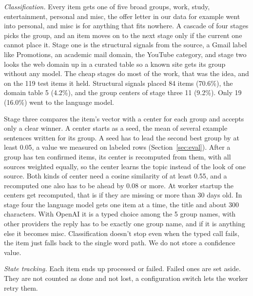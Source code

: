 \documentclass[conference]{IEEEtran}
\begin{document}
\textit{Classification.} Every item gets one of five broad groups, work, study, entertainment, personal and misc, the offer letter in our data for example went into personal, and misc is for anything that fits nowhere. A cascade of four stages picks the group, and an item moves on to the next stage only if the current one cannot place it. Stage one is the structural signals from the source, a Gmail label like Promotions, an academic mail domain, the YouTube category, and stage two looks the web domain up in a curated table so a known site gets its group without any model. The cheap stages do most of the work, that was the idea, and on the 119 test items it held. Structural signals placed 84 items (70.6\%), the domain table 5 (4.2\%), and the group centers of stage three 11 (9.2\%). Only 19 (16.0\%) went to the language model.

Stage three compares the item's vector with a center for each group and accepts only a clear winner. A center starts as a seed, the mean of several example sentences written for its group. A seed has to lead the second best group by at least 0.05, a value we measured on labeled rows (Section~\ref{sec:eval}). After a group has ten confirmed items, its center is recomputed from them, with all sources weighted equally, so the center learns the topic instead of the look of one source. Both kinds of center need a cosine similarity of at least 0.55, and a recomputed one also has to be ahead by 0.08 or more. At worker startup the centers get recomputed, that is if they are missing or more than 30 days old. In stage four the language model gets one item at a time, the title and about 300 characters. With OpenAI it is a typed choice among the 5 group names, with other providers the reply has to be exactly one group name, and if it is anything else it becomes misc. Classification doesn't stop even when the typed call fails, the item just falls back to the single word path. We do not store a confidence value.

\textit{State tracking.} Each item ends up processed or failed. Failed ones are set aside. They are not counted as done and not lost, a configuration switch lets the worker retry them.
\end{document}
